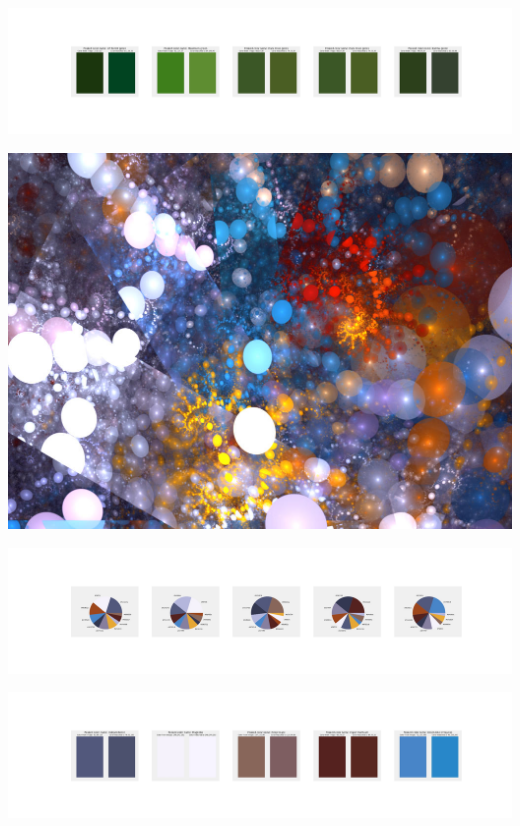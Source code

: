 \documentclass[11pt]{article}
\begin{document}
\begin{landscape}
    \begin{center}
    \includegraphics[width=250mm]{./nbimg/peak-112.jpg}
    \end{center}
    

    \begin{center}
    \includegraphics[width=\textwidth]{./nbimg/file (200).jpg}
    \end{center}

    \begin{center}
    \includegraphics[width=250mm]{./nbimg/pie-113.jpg}
    \end{center}

    \begin{center}
    \includegraphics[width=250mm]{./nbimg/peak-113.jpg}
    \end{center}
    


\end{landscape}
\end{document}
